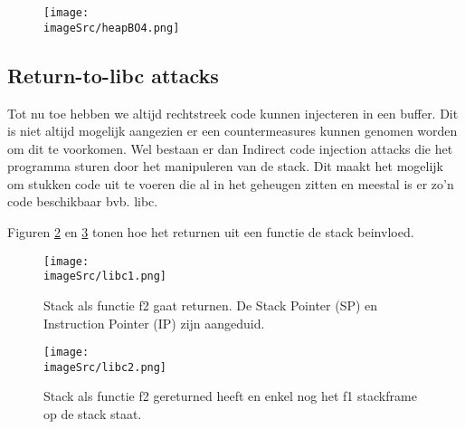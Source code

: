 \documentclass[../main.tex]{subfiles}
\begin{document}
\begin{figure}
\centering
\texttt{[image: \\imageSrc/heapBO4.png]}
\caption{}
\label{f:heapBO4}
\end{figure}
\subsection{Return-to-libc attacks}
Tot nu toe hebben we altijd rechtstreek code kunnen injecteren in een buffer.
Dit is niet altijd mogelijk aangezien er een countermeasures kunnen genomen worden om dit te voorkomen.
Wel bestaan er dan Indirect code injection attacks die het programma sturen door het manipuleren van de stack.
Dit maakt het mogelijk om stukken code uit te voeren die al in het geheugen zitten en meestal is er zo'n code beschikbaar bvb. libc.

Figuren \ref{f:libc1} en \ref{f:libc2} tonen hoe het returnen uit een functie de stack beinvloed.
\begin{figure}
\centering
\texttt{[image: \\imageSrc/libc1.png]}
\caption{Stack als functie f2 gaat returnen. De Stack Pointer (SP) en Instruction Pointer (IP) zijn aangeduid.}
\label{f:libc1}
\end{figure}

\begin{figure}
\centering
\texttt{[image: \\imageSrc/libc2.png]}
\caption{Stack als functie f2 gereturned heeft en enkel nog het f1 stackframe op de stack staat.}
\label{f:libc2}
\end{figure}
\end{document}
